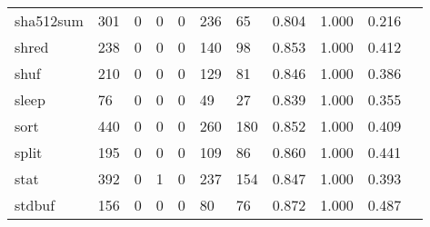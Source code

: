 \begin{longtable}{lp{1.10cm}p{1.10cm}p{1.10cm}p{1.10cm}p{1.10cm}p{1.10cm}p{1.10cm}p{1.10cm}p{1.10cm}p{1.10cm}}
sha512sum &                    301 &                                  0 &                                 0 &                                0 &                               236 &                              65 &                          0.804 &                                 1.000 &                               0.216 \\
shred     &                    238 &                                  0 &                                 0 &                                0 &                               140 &                              98 &                          0.853 &                                 1.000 &                               0.412 \\
shuf      &                    210 &                                  0 &                                 0 &                                0 &                               129 &                              81 &                          0.846 &                                 1.000 &                               0.386 \\
sleep     &                     76 &                                  0 &                                 0 &                                0 &                                49 &                              27 &                          0.839 &                                 1.000 &                               0.355 \\
sort      &                    440 &                                  0 &                                 0 &                                0 &                               260 &                             180 &                          0.852 &                                 1.000 &                               0.409 \\
split     &                    195 &                                  0 &                                 0 &                                0 &                               109 &                              86 &                          0.860 &                                 1.000 &                               0.441 \\
stat      &                    392 &                                  0 &                                 1 &                                0 &                               237 &                             154 &                          0.847 &                                 1.000 &                               0.393 \\
stdbuf    &                    156 &                                  0 &                                 0 &                                0 &                                80 &                              76 &                          0.872 &                                 1.000 &                               0.487 \\

\end{longtable}

